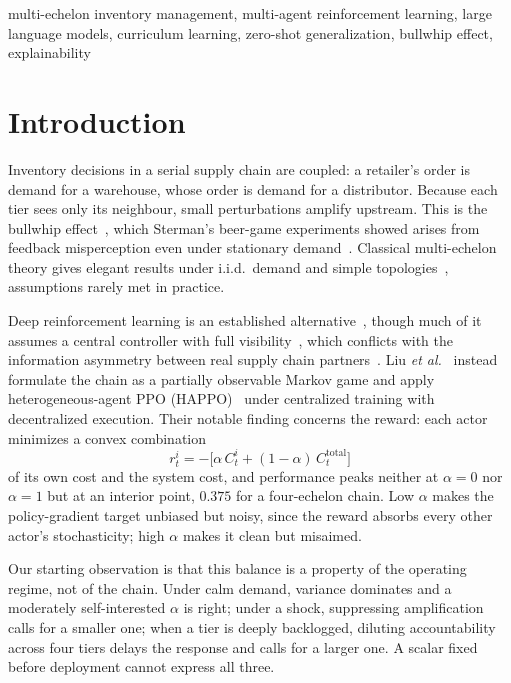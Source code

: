 \documentclass[conference]{IEEEtran}
\begin{document}
\begin{IEEEkeywords}
multi-echelon inventory management, multi-agent reinforcement learning,
large language models, curriculum learning, zero-shot generalization,
bullwhip effect, explainability
\end{IEEEkeywords}

\section{Introduction}

Inventory decisions in a serial supply chain are coupled: a retailer's order
is demand for a warehouse, whose order is demand for a distributor. Because
each tier sees only its neighbour, small perturbations amplify upstream.
This is the bullwhip effect~\cite{lee1997}, which Sterman's beer-game
experiments showed arises from feedback misperception even under stationary
demand~\cite{sterman1989}. Classical multi-echelon theory gives elegant
results under i.i.d.\ demand and simple
topologies~\cite{clark1960,shang2003,zipkin2000}, assumptions rarely met in
practice.

Deep reinforcement learning is an established
alternative~\cite{boute2022}, though much of it assumes a central
controller with full visibility~\cite{gijsbrechts2021,harsha2022}, which
conflicts with the information asymmetry between real supply chain
partners~\cite{vosooghidizaji2020}. Liu \emph{et al.}~\cite{liu2022}
instead formulate the chain as a partially observable Markov game and
apply heterogeneous-agent PPO (HAPPO)~\cite{kuba2021} under centralized
training with decentralized execution. Their notable finding concerns the
reward: each actor minimizes a convex combination
\begin{equation}
r_t^i = -\big[\alpha\, C_t^i + (1-\alpha)\, C_t^{\text{total}}\big]
\label{eq:basereward}
\end{equation}
of its own cost and the system cost, and performance peaks neither at
$\alpha=0$ nor $\alpha=1$ but at an interior point, $0.375$ for a
four-echelon chain. Low $\alpha$ makes the policy-gradient target unbiased
but noisy, since the reward absorbs every other actor's stochasticity;
high $\alpha$ makes it clean but misaimed.

Our starting observation is that this balance is a property of the operating
regime, not of the chain. Under calm demand, variance dominates and a
moderately self-interested $\alpha$ is right; under a shock, suppressing
amplification calls for a smaller one; when a tier is deeply backlogged,
diluting accountability across four tiers delays the response and calls for
a larger one. A scalar fixed before deployment cannot express all three.
\end{document}
